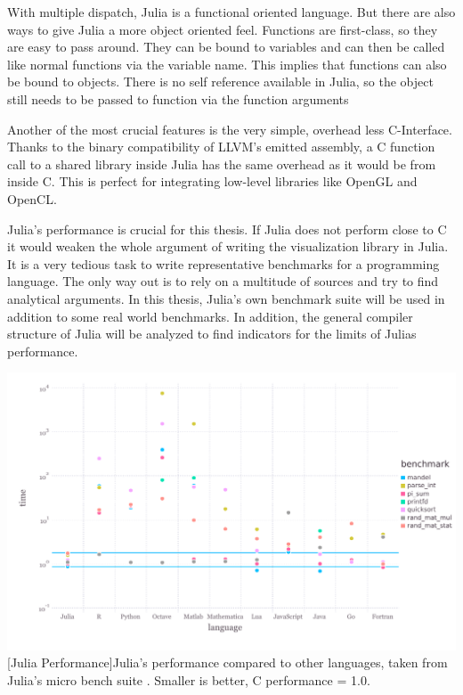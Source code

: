 With multiple dispatch, Julia is a functional oriented language. But there are also ways to give Julia a more object oriented feel.
Functions are first-class, so they are easy to pass around. 
They can be bound to variables and can then be called like normal functions via the variable name. This implies that functions can also be bound to objects.
There is no self reference available in Julia, so the object still needs to be passed to function via the function arguments

Another of the most crucial features is the very simple, overhead less C-Interface. 
Thanks to the binary compatibility of LLVM's emitted assembly, a C function call to a shared library inside Julia has the same overhead as it would be from inside C\cite{CCALL}. 
This is perfect for integrating low-level libraries like \ac{OpenGL} and \ac{OpenCL}.

Julia's performance is crucial for this thesis. 
If Julia does not perform close to C it would weaken the whole argument of writing the visualization library in Julia.
It is a very tedious task to write representative benchmarks for a programming language. 
The only way out is to rely on a multitude of sources and try to find analytical arguments.
In this thesis, Julia's own benchmark suite will be used in addition to some real world benchmarks.
In addition, the general compiler structure of Julia will be analyzed to find indicators for the limits of Julias performance.

\vspace{1em}
\begin{minipage}{\linewidth}
    \centering
    \includegraphics[width=0.9\linewidth]{graphics/juliabench.pdf}
    [Julia Performance]{Julia's performance compared to other languages, taken from Julia's micro bench suite \cite{JuliaBench}. Smaller is better, C performance = 1.0.}
    \label{fig:juliabench}
\end{minipage}

